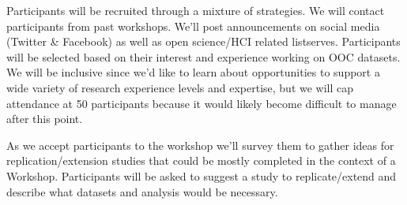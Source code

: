 Participants will be recruited through a mixture of strategies.  We will contact participants from past workshops\cite{wiggins14quality, morgan15advancing, goggins14ocdata}.  We'll post announcements on social media (Twitter \& Facebook) as well as open science/HCI related listserves.  Participants will be selected based on their interest and experience working on OOC datasets.  We will be inclusive since we'd like to learn about opportunities to support a wide variety of research experience levels and expertise, but we will cap attendance at 50 participants because it would likely become difficult to manage after this point.

As we accept participants to the workshop we'll survey them to gather ideas for replication/extension studies that could be mostly completed in the context of a Workshop.  Participants will be asked to suggest a study to replicate/extend and describe what datasets and analysis would be necessary.
